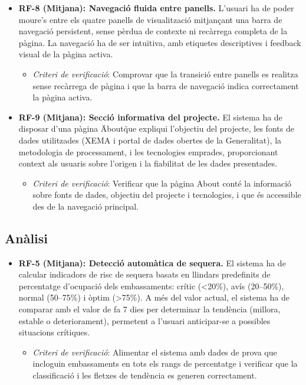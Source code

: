 \begin{itemize}
    \item \textbf{RF-8 (Mitjana): Navegació fluida entre panells.} L'usuari ha de poder moure's entre els quatre panells de visualització mitjançant una barra de navegació persistent, sense pèrdua de contexte ni recàrrega completa de la pàgina. La navegació ha de ser intuïtiva, amb etiquetes descriptives i feedback visual de la pàgina activa.
    \begin{itemize}
        \item \textit{Criteri de verificació}: Comprovar que la transició entre panells es realitza sense recàrrega de pàgina i que la barra de navegació indica correctament la pàgina activa.
    \end{itemize}

    \item \textbf{RF-9 (Mitjana): Secció informativa del projecte.} El sistema ha de disposar d'una pàgina \"About\" que expliqui l'objectiu del projecte, les fonts de dades utilitzades (XEMA i portal de dades obertes de la Generalitat), la metodologia de processament, i les tecnologies emprades, proporcionant context als usuaris sobre l'origen i la fiabilitat de les dades presentades.
    \begin{itemize}
        \item \textit{Criteri de verificació}: Verificar que la pàgina About conté la informació sobre fonts de dades, objectiu del projecte i tecnologies, i que és accessible des de la navegació principal.
    \end{itemize}
\end{itemize}

\subsection{Anàlisi}

\begin{itemize}
    \item \textbf{RF-5 (Mitjana): Detecció automàtica de sequera.} El sistema ha de calcular indicadors de risc de sequera basats en llindars predefinits de percentatge d'ocupació dels embassaments: crític (\textless20\%), avís (20--50\%), normal (50--75\%) i \`{o}ptim (\textgreater75\%). A més del valor actual, el sistema ha de comparar amb el valor de fa 7 dies per determinar la tendència (millora, estable o deteriorament), permetent a l'usuari anticipar-se a possibles situacions crítiques.
    \begin{itemize}
        \item \textit{Criteri de verificació}: Alimentar el sistema amb dades de prova que incloguin embassaments en tots els rangs de percentatge i verificar que la classificació i les fletxes de tendència es generen correctament.
    \end{itemize}
\end{itemize}


